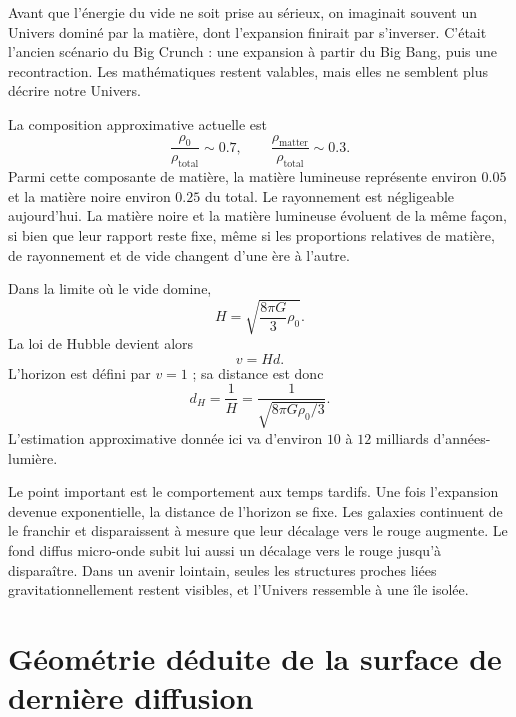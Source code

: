 Avant que l’énergie du vide ne soit prise au sérieux, on imaginait souvent un Univers dominé par la matière, dont l’expansion finirait par s’inverser. C’était l’ancien scénario du Big Crunch : une expansion à partir du Big Bang, puis une recontraction. Les mathématiques restent valables, mais elles ne semblent plus décrire notre Univers.

\begin{classroomqa}\end{classroomqa}

La composition approximative actuelle est
\begin{equation}
\frac{\rho_0}{\rho_{\text{total}}}\sim 0.7,
\qquad
\frac{\rho_{\text{matter}}}{\rho_{\text{total}}}\sim 0.3.
\end{equation}
Parmi cette composante de matière, la matière lumineuse représente environ \(0.05\) et la matière noire environ \(0.25\) du total. Le rayonnement est négligeable aujourd’hui. La matière noire et la matière lumineuse évoluent de la même façon, si bien que leur rapport reste fixe, même si les proportions relatives de matière, de rayonnement et de vide changent d’une ère à l’autre.

Dans la limite où le vide domine,
\begin{equation}
H=\sqrt{\frac{8\pi G}{3}\rho_0}.
\end{equation}
La loi de Hubble devient alors
\begin{equation}
v=Hd.
\end{equation}
L’horizon est défini par \(v=1\) ; sa distance est donc
\begin{equation}
d_H=\frac{1}{H}
=
\frac{1}{\sqrt{8\pi G\rho_0/3}}.
\end{equation}
L’estimation approximative donnée ici va d’environ \(10\) à \(12\) milliards d’années-lumière.

Le point important est le comportement aux temps tardifs. Une fois l’expansion devenue exponentielle, la distance de l’horizon se fixe. Les galaxies continuent de le franchir et disparaissent à mesure que leur décalage vers le rouge augmente. Le fond diffus micro-onde subit lui aussi un décalage vers le rouge jusqu’à disparaître. Dans un avenir lointain, seules les structures proches liées gravitationnellement restent visibles, et l’Univers ressemble à une île isolée.

\section{Géométrie déduite de la surface de dernière diffusion}


